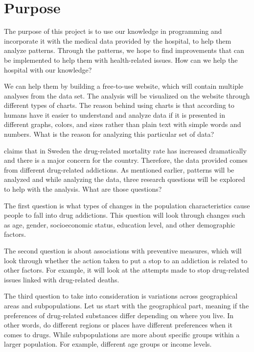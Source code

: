 \section{Purpose}
The purpose of this project is to use our knowledge in programming and incorporate it with the medical data provided by the hospital, to help them analyze patterns. Through the patterns, we hope to find improvements that can be implemented to help them with health-related issues. How can we help the hospital with our knowledge?

We can help them by building a free-to-use website, which will contain multiple analyses from the data set. The analysis will be visualized on the website through different types of charts. The reason behind using charts is that according to \cite{pyvis} humans have it easier to understand and analyze data if it is presented in different graphs, colors, and sizes rather than plain text with simple words and numbers. What is the reason for analyzing this particular set of data?


\cite{medData} claims that in Sweden the drug-related mortality rate has increased dramatically and there is a major concern for the country. Therefore, the data provided comes from different drug-related addictions. As mentioned earlier, patterns will be analyzed and while analyzing the data, three research questions will be explored to help with the analysis. What are those questions?

The first question is what types of changes in the population characteristics cause people to fall into drug addictions. This question will look through changes such as age, gender, socioeconomic status, education level, and other demographic factors.

The second question is about associations with preventive measures, which will look through whether the action taken to put a stop to an addiction is related to other factors. For example, it will look at the attempts made to stop drug-related issues linked with drug-related deaths. 

The third question to take into consideration is variations across geographical areas and subpopulations. Let us start with the geographical part, meaning if the preferences of drug-related substances differ depending on where you live. In other words, do different regions or places have different preferences when it comes to drugs. While subpopulations are more about specific groups within a larger population. For example, different age groups or income levels. 
